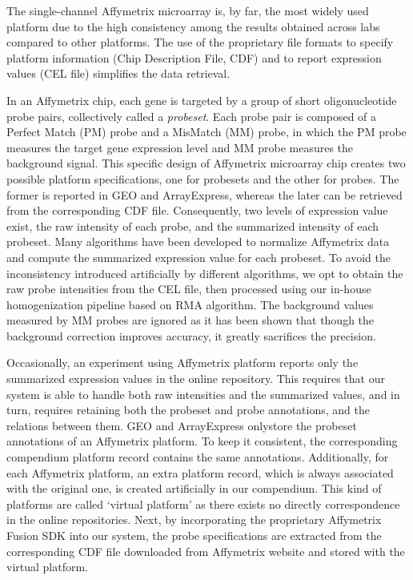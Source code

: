The single-channel Affymetrix microarray is, by far, the most widely used platform due to the high consistency among the results obtained across labs compared to other platforms\cite{Irizarry2005}. The use of the proprietary file formats to specify platform information (Chip Description File, CDF) and to report expression values (CEL file) simplifies the data retrieval. 

In an Affymetrix chip, each gene is targeted by a group of short oligonucleotide probe pairs, collectively called a \textit{probeset}. Each probe pair is composed of a Perfect Match (PM) probe and a MisMatch (MM) probe, in which the PM probe measures the target gene expression level and MM probe measures the background signal. This specific design of Affymetrix microarray chip creates two possible platform specifications, one for probesets and the other for probes. The former is reported in GEO and ArrayExpress, whereas the later can be retrieved from the corresponding CDF file. Consequently, two levels of expression value exist, the raw intensity of each probe, and the summarized intensity of each probeset. Many algorithms \cite{Irizarry2003, Li2001, Hubbell2002} have been developed to normalize Affymetrix data and compute the summarized expression value for each probeset. To avoid the inconsistency introduced artificially by different algorithms, we opt to obtain the raw probe intensities from the CEL file, then processed using our in-house homogenization pipeline based on RMA algorithm. The background values measured by MM probes are ignored as it has been shown that though the background correction improves accuracy, it greatly sacrifices the precision\cite{Irizarry2006}.
 
Occasionally, an experiment using Affymetrix platform reports only the summarized expression values in the online repository. This requires that our system is able to handle both raw intensities and the summarized values, and in turn, requires retaining both the probeset and probe annotations, and the relations between them. GEO and ArrayExpress onlystore the probeset annotations of an Affymetrix platform. To keep it consistent, the corresponding compendium platform record contains the same annotations. Additionally, for each Affymetrix platform, an extra platform record, which is always associated with the original one, is created artificially in our compendium. This kind of platforms are called `virtual platform' as there exists no directly correspondence in the online repositories. Next, by incorporating the proprietary Affymetrix Fusion SDK into our system, the probe specifications are extracted from the corresponding CDF file downloaded from Affymetrix website and stored with the virtual platform. 

